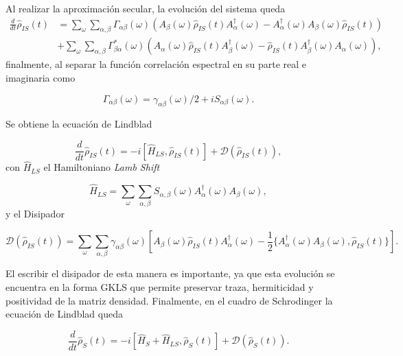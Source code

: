 Al realizar la aproximación secular, la evolución del sistema queda
\begin{align*}
    \frac{d}{dt}\hat{\rho}_{IS}(t) & = \sum_{\omega}\sum_{\alpha,\beta} \Gamma_{\alpha \beta}(\omega)\left(A_{\beta}(\omega)\hat{\rho}_{IS}(t)A^{\dagger}_{\alpha}(\omega) - A^{\dagger}_{\alpha}(\omega)A_{\beta}(\omega) \hat{\rho}_{IS}(t) \right) \\
    & + \sum_{\omega}\sum_{\alpha,\beta} \Gamma^{*}_{\beta \alpha}(\omega) \left(A_{\alpha}(\omega)\hat{\rho}_{IS}(t)A^{\dagger}_{\beta}(\omega) - \hat{\rho}_{IS}(t)A^{\dagger}_{\beta}(\omega)A_{\alpha}(\omega) \right),
\end{align*}
finalmente, al separar la función correlación espectral en su parte real e imaginaria como

\begin{equation*}
\Gamma_{\alpha \beta}(\omega) = \gamma_{\alpha \beta}(\omega)/2 + iS_{\alpha \beta}(\omega).
\end{equation*}

Se obtiene la ecuación de Lindblad 

\begin{equation}
    \frac{d}{dt} \hat{\rho}_{IS}(t) = -i[\hat{H}_{LS},\hat{\rho}_{IS}(t)] + \mathcal{D}(\hat{\rho}_{IS}(t)),
    \label{seclindbladfinal}
\end{equation}
con $\hat{H}_{LS}$ el Hamiltoniano \textit{Lamb Shift}

\begin{equation*}
    \hat{H}_{LS} = \sum_{\omega} \sum_{\alpha,\beta} S_{\alpha,\beta}(\omega)A^{\dagger}_{\alpha}(\omega)A_{\beta}(\omega), 
\end{equation*}
y el Disipador

\begin{equation*}
    \mathcal{D}(\hat{\rho}_{IS}(t)) = \sum_{\omega}\sum_{\alpha,\beta} \gamma_{\alpha \beta}(\omega) \left[ A_{\beta}(\omega)\hat{\rho}_{IS}(t)A^{\dagger}_{\alpha}(\omega) - \frac{1}{2}\{A^{\dagger}_{\alpha}(\omega)A_{\beta}(\omega), \hat{\rho}_{IS}(t)  \} \right].
\end{equation*}

El escribir el disipador de esta manera es importante, ya que esta evolución se encuentra en la forma GKLS que permite preservar traza, hermiticidad y positividad de la matriz densidad\cite{manzano2020short}. Finalmente, en el cuadro de Schrodinger la ecuación de Lindblad queda

\begin{equation}
    \frac{d}{dt} \hat{\rho}_{S}(t) = -i[\hat{H}_{S}+\hat{H}_{LS},\hat{\rho}_{S}(t)] + \mathcal{D}(\hat{\rho}_{S}(t)).
    \label{eqsec2:lindbladS}
\end{equation}

